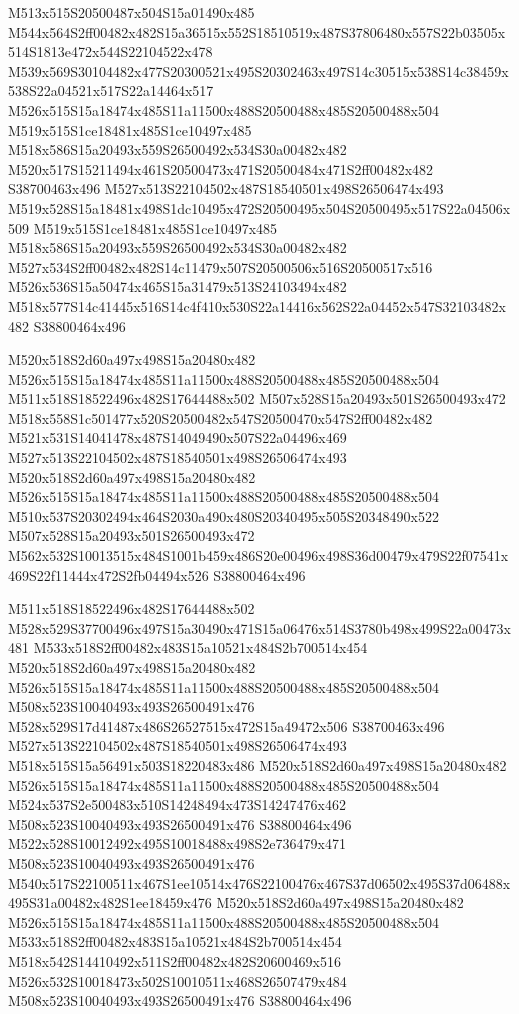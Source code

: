 \documentclass{article}
\begin{document}
\begin{multicols}{2}
M513x515S20500487x504S15a01490x485 M544x564S2ff00482x482S15a36515x552S18510519x487S37806480x557S22b03505x514S1813e472x544S22104522x478 M539x569S30104482x477S20300521x495S20302463x497S14c30515x538S14c38459x538S22a04521x517S22a14464x517 M526x515S15a18474x485S11a11500x488S20500488x485S20500488x504 M519x515S1ce18481x485S1ce10497x485 M518x586S15a20493x559S26500492x534S30a00482x482 M520x517S15211494x461S20500473x471S20500484x471S2ff00482x482 S38700463x496 M527x513S22104502x487S18540501x498S26506474x493 M519x528S15a18481x498S1dc10495x472S20500495x504S20500495x517S22a04506x509 M519x515S1ce18481x485S1ce10497x485 M518x586S15a20493x559S26500492x534S30a00482x482 M527x534S2ff00482x482S14c11479x507S20500506x516S20500517x516 M526x536S15a50474x465S15a31479x513S24103494x482 M518x577S14c41445x516S14c4f410x530S22a14416x562S22a04452x547S32103482x482 S38800464x496

M520x518S2d60a497x498S15a20480x482 M526x515S15a18474x485S11a11500x488S20500488x485S20500488x504 M511x518S18522496x482S17644488x502 M507x528S15a20493x501S26500493x472 M518x558S1c501477x520S20500482x547S20500470x547S2ff00482x482 M521x531S14041478x487S14049490x507S22a04496x469 M527x513S22104502x487S18540501x498S26506474x493 M520x518S2d60a497x498S15a20480x482 M526x515S15a18474x485S11a11500x488S20500488x485S20500488x504 M510x537S20302494x464S2030a490x480S20340495x505S20348490x522 M507x528S15a20493x501S26500493x472 M562x532S10013515x484S1001b459x486S20e00496x498S36d00479x479S22f07541x469S22f11444x472S2fb04494x526 S38800464x496

M511x518S18522496x482S17644488x502 M528x529S37700496x497S15a30490x471S15a06476x514S3780b498x499S22a00473x481 M533x518S2ff00482x483S15a10521x484S2b700514x454 M520x518S2d60a497x498S15a20480x482 M526x515S15a18474x485S11a11500x488S20500488x485S20500488x504 M508x523S10040493x493S26500491x476 M528x529S17d41487x486S26527515x472S15a49472x506 S38700463x496 M527x513S22104502x487S18540501x498S26506474x493 M518x515S15a56491x503S18220483x486 M520x518S2d60a497x498S15a20480x482 M526x515S15a18474x485S11a11500x488S20500488x485S20500488x504 M524x537S2e500483x510S14248494x473S14247476x462 M508x523S10040493x493S26500491x476 S38800464x496 M522x528S10012492x495S10018488x498S2e736479x471 M508x523S10040493x493S26500491x476 M540x517S22100511x467S1ee10514x476S22100476x467S37d06502x495S37d06488x495S31a00482x482S1ee18459x476 M520x518S2d60a497x498S15a20480x482 M526x515S15a18474x485S11a11500x488S20500488x485S20500488x504 M533x518S2ff00482x483S15a10521x484S2b700514x454 M518x542S14410492x511S2ff00482x482S20600469x516 M526x532S10018473x502S10010511x468S26507479x484 M508x523S10040493x493S26500491x476 S38800464x496


\end{multicols}
\end{document}

